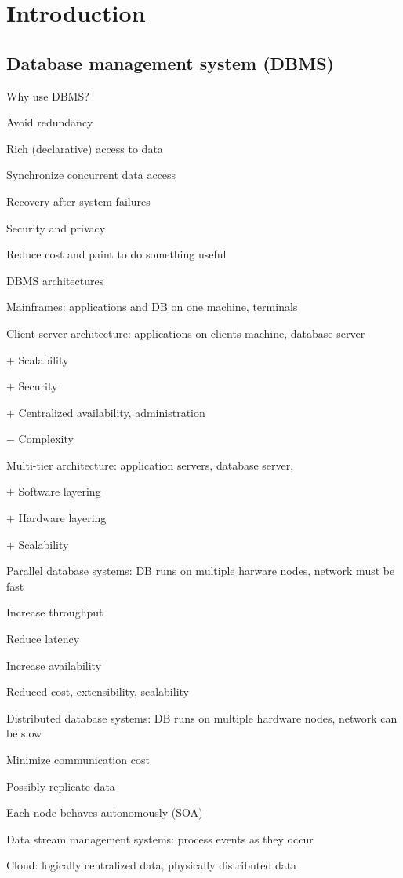 \section{Introduction}

\subsection{Database management system (DBMS)}
\enumstart
	\item Why use DBMS?
	\enumstart
		\item Avoid redundancy
		\item Rich (declarative) access to data
		\item Synchronize concurrent data access
		\item Recovery after system failures
		\item Security and privacy
		\item Reduce cost and paint to do something useful
	\enumend
	\item DBMS architectures
	\enumstart
		\item Mainframes: applications and DB on one machine, terminals
		\item Client-server architecture: applications on clients machine, database server
		\enumstart
			\item $+$ Scalability
			\item $+$ Security
			\item $+$ Centralized availability, administration
			\item $-$ Complexity
		\enumend
		\item Multi-tier architecture: application servers, database server, \ddd
		\enumstart
			\item $+$ Software layering
			\item $+$ Hardware layering
			\item $+$ Scalability
		\enumend
		\item Parallel database systems: DB runs on multiple harware nodes, network must be fast
		\enumstart
			\item Increase throughput
			\item Reduce latency
			\item Increase availability
			\item Reduced cost, extensibility, scalability
		\enumend
		\item Distributed database systems: DB runs on multiple hardware nodes, network can be slow
		\enumstart
			\item Minimize communication cost
			\item Possibly replicate data
			\item Each node behaves autonomously (SOA)
		\enumend
		\item Data stream management systems: process events as they occur
		\item Cloud: logically centralized data, physically distributed data
	\enumend
\enumend

